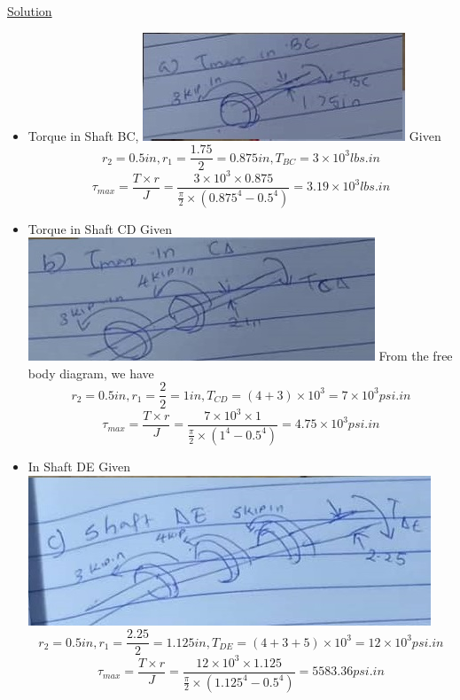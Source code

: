 \documentclass{article}
\begin{document}
\begin{center}\underline{Solution}\end{center}
\begin{itemize}
\item Torque in Shaft BC,\newline
\includegraphics{IMG-20220210-WA0006}\newline
Given\[r_{2} = 0.5in, r_{1}=\frac{1.75}{2} = 0.875in, T_{BC} = 3\times10^{3}lbs.in\]
\[\tau_{max} = \frac{T\times r}{J} = \frac{3\times10^{3}\times0.875}{\frac{\pi}{2} \times (0.875^{4} - 0.5^{4})} = 3.19\times10^{3}lbs.in\]
\item Torque in Shaft CD\newline
Given\newline
\includegraphics{IMG-20220210-WA0008}\newline
From the free body diagram, we have
\[r_{2} = 0.5in, r_{1}=\frac{2}{2} = 1in, T_{CD}=(4+3)\times10^{3} = 7\times10^{3}psi.in\]
\[\tau_{max} = \frac{T\times r}{J} = \frac{7\times10^{3}\times1}{\frac{\pi}{2} \times (1^{4} - 0.5^{4})} = 4.75\times10^{3}psi.in\]
\item In Shaft DE\newline
Given \newline
\includegraphics{IMG-20220210-WA0009}\newline
\[r_{2} = 0.5in, r_{1}=\frac{2.25}{2} = 1.125in, T_{DE}=(4+3+5)\times10^{3} = 12\times10^{3}psi.in\]
\[\tau_{max} = \frac{T\times r}{J} = \frac{12\times10^{3}\times1.125}{\frac{\pi}{2} \times (1.125^{4} - 0.5^{4})} = 5583.36psi.in\]
\end{itemize}
\end{document}
